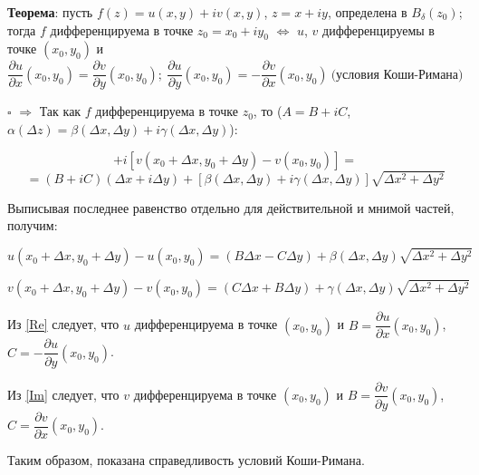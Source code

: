 \documentclass[12pt, a4paper, reqno]{article}
\begin{document}
    \textbf{Теорема}: пусть $f(z) = u(x, y) + iv(x, y)$, $z = x + iy$, определена в $B_{\delta}(z_0)$;
    тогда $f$ дифференцируема в точке $z_0 = x_0 + i y_0$ $\iff$ $u$, $v$ дифференцируемы в точке
    $(x_0, y_0)$ и
    \begin{equation*}
        \boxed{\frac{\partial u}{\partial x}(x_0, y_0) = \frac{\partial v}{\partial y}(x_0, y_0);\
        \frac{\partial u}{\partial y}(x_0, y_0) = -\frac{\partial v}{\partial x}(x_0, y_0)}\
        \text{(условия Коши-Римана)}
    \end{equation*}

    $\square$ $\boxed{\Rightarrow}$ Так как $f$ дифференцируема в точке $z_0$, то ($A = B + iC$,
    $\alpha(\Delta z) = \beta(\Delta x, \Delta y) + i\gamma(\Delta x, \Delta y)$):

    \begin{equation*}
        [u(x_0 + \Delta x, y_0 + \Delta y) - u(x_0, y_0)]
        + i[v(x_0 + \Delta x, y_0 + \Delta y) - v(x_0, y_0)] =
    \end{equation*}
    \begin{equation}\label{complex}
        = (B + iC)(\Delta x + i\Delta y) + [\beta(\Delta x, \Delta y) + i\gamma(\Delta x, \Delta y)]
        \sqrt{\Delta x^2 + \Delta y^2}
    \end{equation}

    Выписывая последнее равенство отдельно для действительной и мнимой частей, получим:

    \begin{equation}\label{Re}
        u(x_0 + \Delta x, y_0 + \Delta y) - u(x_0, y_0) = (B\Delta x - C\Delta y) +
        \beta(\Delta x, \Delta y)\sqrt{\Delta x^2 + \Delta y^2}
    \end{equation}

    \begin{equation}\label{Im}
        v(x_0 + \Delta x, y_0 + \Delta y) - v(x_0, y_0) = (C\Delta x + B\Delta y) +
        \gamma(\Delta x, \Delta y)\sqrt{\Delta x^2 + \Delta y^2}
    \end{equation}

    Из \eqref{Re} следует, что $u$ дифференцируема в точке $(x_0, y_0)$ и
    $B = \dfrac{\partial u}{\partial x}(x_0, y_0)$, $C = -\dfrac{\partial u}{\partial y}(x_0, y_0)$.

    Из \eqref{Im} следует, что $v$ дифференцируема в точке $(x_0, y_0)$ и
    $B = \dfrac{\partial v}{\partial y}(x_0, y_0)$, $C = \dfrac{\partial v}{\partial x}(x_0, y_0)$.

    Таким образом, показана справедливость условий Коши-Римана.
\end{document}
